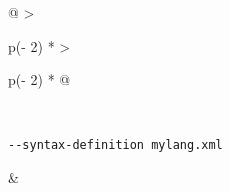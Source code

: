 \begin{longtable}[]{@{}
  >{\raggedright\arraybackslash}p{(\columnwidth - 2\tabcolsep) * }
  >{\raggedright\arraybackslash}p{(\columnwidth - 2\tabcolsep) * }@{}}
\begin{minipage}[t]{\linewidth}
\begin{Shaded}
\begin{Highlighting}[]
\end{Highlighting}
\end{Shaded}
\end{minipage} \\
\begin{minipage}[t]{\linewidth}\raggedright
\begin{verbatim}
--syntax-definition mylang.xml
\end{verbatim}
\end{minipage} & \begin{minipage}[t]{\linewidth}\raggedright
\begin{Shaded}
\begin{Highlighting}[]
\KeywordTok{:}
\AttributeTok{  }\KeywordTok{{-}}
\end{Highlighting}
\end{Shaded}


\end{minipage}
\end{longtable}

